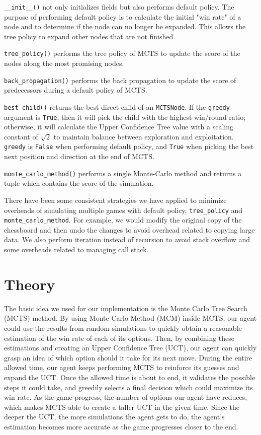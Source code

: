 \documentclass[twoside,11pt]{article}
\begin{document}
\texttt{\_\_init\_\_()} not only initializes fields but also performs default policy.
The purpose of performing default policy is to calculate the initial "win rate" of a node and to determine if the node can no longer be expanded.
This allows the tree policy to expand other nodes that are not finished.

\texttt{tree\_policy()} performs the tree policy of MCTS to update the score of the nodes along the most promising nodes.

\texttt{back\_propagation()} performs the back propagation to update the score of predecessors during a default policy of MCTS.

\texttt{best\_child()} returns the best direct child of an \texttt{MCTSNode}.
If the \texttt{greedy} argument is \texttt{True}, then it will pick the child with the highest win/round ratio;
otherwise, it will calculate the Upper Confidence Tree value with a scaling constant of \(\sqrt{2}\) to maintain balance between exploration and exploitation.
\texttt{greedy} is \texttt{False} when performing default policy, and \texttt{True} when picking the best next position and direction at the end of MCTS.

\texttt{monte\_carlo\_method()} performs a single Monte-Carlo method and returns a tuple which contains the score of the simulation.

There have been some consistent strategies we have applied to minimize overheads of simulating multiple games with default policy, \texttt{tree\_policy} and \texttt{monte\_carlo\_method}.
For example, we would modify the original copy of the chessboard and then undo the changes to avoid overhead related to copying large data.
We also perform iteration instead of recursion to avoid stack overflow and some overheads related to managing call stack.

\section{Theory}
The basic idea we used for our implementation is the Monte Carlo Tree Search (MCTS) method.
By using Monte Carlo Method (MCM) inside MCTS, our agent could use the results from random simulations to quickly obtain a reasonable estimation of the win rate of each of its options.
Then, by combining these estimations and creating an Upper Confidence Tree (UCT), our agent can quickly grasp an idea of which option should it take for its next move.
During the entire allowed time, our agent keeps performing MCTS to reinforce its guesses and expand the UCT.
Once the allowed time is about to end, it validates the possible steps it could take, and greedily selects a final decision which could maximize its win rate.
As the game progress, the number of options our agent have reduces, which makes MCTS able to create a taller UCT in the given time. 
Since the deeper the UCT, the more simulations the agent gets to do, the agent's estimation becomes more accurate as the game progresses closer to the end.
\end{document}
